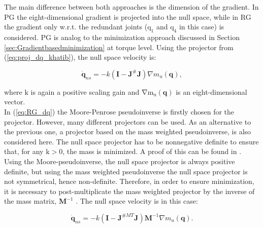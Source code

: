 The main difference between both approaches is the dimension of the gradient.  In PG the eight-dimensional gradient is projected into the null space, while in RG the gradient only w.r.t. the redundant joints ($\mathrm{q_1}$ and $\mathrm{q_4}$ in this case) is considered.
PG is analog to the minimization approach discussed in Section \ref{sec:Gradientbasedminimization} at torque level. Using the projector from (\ref{eq:proj_dq_khatib}), the null space velocity is:


\begin{equation}
\mathbf{\dot{q}}_{ns} =  - k (\mathbf{I} -  \mathbf{J}^{\#} \mathbf{J} ) \nabla m_u(\mathbf{q}), \label{eq:RG_dq}
\end{equation}

where  $\mathrm{k}$ is again a positive scaling gain and $\mathrm{\nabla m_u(\mathbf{q})}$ is an eight-dimensional vector.\\
%
%
%
%
%
In (\ref{eq:RG_dq}) the Moore-Penrose pseudoinverse is firstly chosen for the projector. 
However, many different projectors can be used. As an alternative to the previous one, a projector based on the mass weighted pseudoinverse, is also considered here. The null space projector has to be nonnegative definite to ensure that, for any $\mathrm{k > 0}$, the mass is minimized. A proof of this can be found in \cite{yoshikawa}. Using the Moore-pseudoinverse, the null space projector is always positive definite, but using the mass weighted pseudoinverse the null space projector is not symmetrical, hence non-definite. Therefore, in order to ensure minimization, it is necessary to post-multiplicate the mass weighted projector by the inverse of the mass matrix, $\mathbf{M}^{-1}$  \cite{Nemec}. The null space velocity is in this case: 

\begin{equation}
	\mathbf{\dot{q}}_{ns} =  - k (\mathbf{I} -  \mathbf{J}^{\#MT} \mathbf{J} ) \mathbf{M}^{-1} \nabla {m}_u(\mathbf{q}). \label{eq:RG_dq_nemec}
\end{equation}






